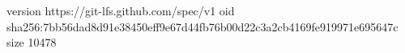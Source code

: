 version https://git-lfs.github.com/spec/v1
oid sha256:7bb56dad8d91e38450eff9e67d44fb76b00d22c3a2cb4169fe919971e695647c
size 10478
